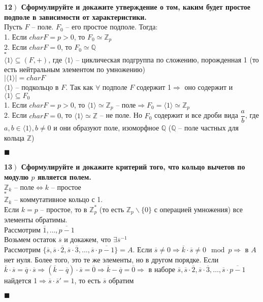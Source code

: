 \documentclass[a4paper,12pt]{article}
\begin{document}
    \textbf{12$\left.\right)$ Сформулируйте и докажите утверждение о том, каким будет простое подполе в зависимости от характеристики.}\\Пусть $F$ -- поле. $F_0$ -- его простое подполе. Тогда:\\
    1. Если $char F=p>0$, то $F_0\simeq \mathbb{Z}_p$\\
    2. Если $char F=0$, то $F_0\simeq\mathbb{Q}$\\
    $\square$\\
    $\langle 1\rangle\subseteq(F, +)$, где $\langle 1\rangle$ -- циклическая подгруппа по сложению, порожденная 1 (то есть нейтральным элементом по умножению)\\
    $|\langle 1\rangle|=char F$\\
    $\langle 1\rangle$ -- подкольцо в $F$. Так как $\forall$ подполе $F$ содержит 1$\Rightarrow$ оно содержит и $\langle 1\rangle\subseteq F_0$\\
    1. Если $char F=p>0$, то $\langle 1\rangle\simeq\mathbb{Z}_p$ -- поле$\Rightarrow F_0=\langle 1\rangle\simeq\mathbb{Z}_p$\\
    2. Если $char F=0$, то $\langle 1\rangle\simeq\mathbb{Z}$ -- не поле. Но $F_0$ содержит и все дроби вида $\dfrac{a}{b}$, где $a, b\in \langle 1\rangle, b\ne0$ и они образуют поле, изоморфное $\mathbb{Q}$ ($\mathbb{Q}$ -- поле частных для кольца $\mathbb{Z}$)
    \begin{flushright}
        $\blacksquare$
    \end{flushright}

    \textbf{13$\left.\right)$ Сформулируйте и докажите критерий того, что кольцо вычетов по модулю $p$ является полем.}\\$\mathbb{Z}_k$ -- поле$\Leftrightarrow k$ -- простое\\
    $\square$\\
    $\mathbb{Z}_k$ -- коммутативное кольцо с 1.\\
    Если $k=p$ -- простое, то в $\mathbb{Z}_p^*$ (то есть $\mathbb{Z}_p\backslash\{0\}$ с операцией умножения) все элементы обратимы.\\
    Рассмотрим $\overline1, \ldots, \overline{p-1}$\\
    Возьмем остаток $\overline s$ и докажем, что $\exists\overline s^{-1}$\\
    Рассмотрим $\{\overline s, \overline s\cdot\overline2, \overline s\cdot\overline3, \ldots, \overline s\cdot\overline{p-1} \}=A$. Если $\overline s\ne 0\Rightarrow\overline k\cdot\overline s\ne0\mod p\Rightarrow$ в $A$ нет нуля. Более того, это те же элементы, но в другом порядке. Если $\overline k\cdot\overline s=\overline q\cdot\overline s\Rightarrow(\overline k-\overline q)\cdot\overline s=\overline0\Rightarrow\overline k-\overline q=\overline0\Rightarrow$ в наборе $\overline s, \overline s\cdot\overline 2, \overline s\cdot\overline 3, \ldots, \overline s\cdot\overline{p-1}$ найдется 1$\Rightarrow \overline s\cdot\overline s'=1$, то есть $\overline s$ обратим
    \begin{flushright}
        $\blacksquare$
    \end{flushright}
    \textbf{}\\ \\
\end{document}
